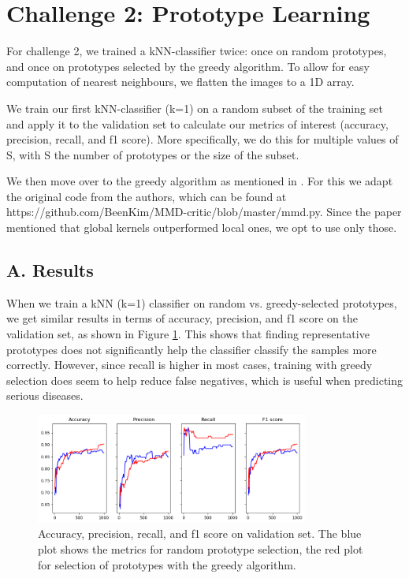 \section*{Challenge 2: Prototype Learning}
For challenge 2, we trained a kNN-classifier twice: once on random prototypes, and once on prototypes selected by the greedy algorithm.
To allow for easy computation of nearest neighbours, we flatten the images to a 1D array.

We train our first kNN-classifier (k=1) on a random subset of the training set and apply it to the validation set to calculate our metrics of interest (accuracy, precision, recall, and f1 score). More specifically, we do this for multiple values of S, with S the number of prototypes or the size of the subset.

We then move over to the greedy algorithm as mentioned in \cite{kim2016MMD}. For this we adapt the original code from the authors, which can be found at https://github.com/BeenKim/MMD-critic/blob/master/mmd.py. Since the paper mentioned that global kernels outperformed local ones, we opt to use only those.

\subsection*{A. Results}

When we train a kNN (k=1) classifier on random vs. greedy-selected prototypes, we get similar results in terms of accuracy, precision, and f1 score on the validation set, as shown in Figure \ref{fig:proto_metrics}. This shows that finding representative prototypes does not significantly help the classifier classify the samples more correctly. However, since recall is higher in most cases, training with greedy selection does seem to help reduce false negatives, which is useful when predicting serious diseases.

\begin{figure}
    \centering
    \includegraphics[width=0.8\textwidth]{images/proto_val_metrics.png}
    \caption{Accuracy, precision, recall, and f1 score on validation set. The blue plot shows the metrics for random prototype selection, the red plot for selection of prototypes with the greedy algorithm.}
    \label{fig:proto_metrics}
\end{figure}


